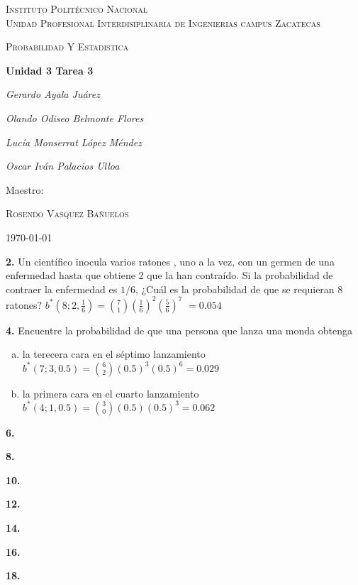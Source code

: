 \documentclass[12pt, letterpaper]{article}
\begin{document}
    \begin{titlepage}
        \centering
        {\scshape\LARGE Instituto Politécnico Nacional\\ Unidad Profesional Interdisiplinaria de Ingenierias campus Zacatecas\par}
        \vspace{1cm}
        {\scshape\Large Probabilidad Y Estadistica\par}
        \vspace{1.5cm}
        {\huge\bfseries Unidad 3 Tarea 3\par}
        \vspace{2cm}
        {\Large\itshape Gerardo Ayala Juárez\par}
        {\Large\itshape Olando Odiseo Belmonte Flores\par}
        {\Large\itshape Lucía Monserrat López Méndez\par}
        {\Large\itshape Oscar Iván Palacios Ulloa\par}
        \vfill
        Maestro:\par
        \textsc{
        Rosendo Vasquez Bañuelos}
        \vfill
        {\large \today \par}
    \end{titlepage}

    \textbf{2. }Un científico inocula varios ratones , uno a la vez, con un germen de una enfermedad hasta que obtiene 2
    que la han contraído. Si la probabilidad  de contraer la enfermedad es $1/6$, ¿Cuál es la probabilidad de que se
    requieran 8 ratones?\vskip0.5cm
    $b^*\left(8;2,\displaystyle\frac{1}{6}\right)=\displaystyle\binom{7}{1}\left(\frac{1}{6}\right)^2\left(\frac{5}{6}\right)^7$
    $=0.054$
    \vskip1cm

    \textbf{4. }Encuentre la probabilidad  de que una persona que lanza una monda obtenga
    \begin{enumerate}[a)]
        \item la terecera cara en el séptimo lanzamiento\\
            $b^*\left(7;3,0.5\right)=\displaystyle\binom{6}{2}\left(0.5\right)^3\left(0.5\right)^6=0.029$
        \item la primera cara en el cuarto lanzamiento\\
            $b^*\left(4;1,0.5\right)=\displaystyle\binom{3}{0}\left(0.5\right)\left(0.5\right)^3=0.062$
    \end{enumerate}\vskip1cm

    \textbf{6. }\vskip1cm

    \textbf{8. }\vskip1cm

    \textbf{10. }\vskip1cm

    \textbf{12. }\vskip1cm

    \textbf{14. }\vskip1cm

    \textbf{16. }\vskip1cm

    \textbf{18. }\vskip1cm
\end{document}
